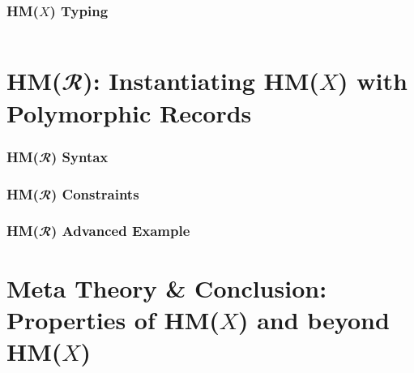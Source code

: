 \documentclass[aspectratio=169]{beamer}
\begin{document}
\begin{frame}[fragile]
  \frametitle{HM($X$) Typing}
  \begin{columns}
    \begin{column}{0.45\textwidth}
      \begin{center}
        \HMXLet
      \end{center}
      \begin{center}
        \HMXEq
      \end{center}
    \end{column}
    \begin{column}{0.45\textwidth}
      \begin{center}
        \HMXIntro
      \end{center}
      \begin{center}
        \HMXElim
      \end{center}
    \end{column}
  \end{columns}
\end{frame}

\section{HM($𝓡$): Instantiating HM($X$) with Polymorphic Records}

\begin{frame}[fragile]
  \frametitle{HM($𝓡$) Syntax}
\end{frame}

\begin{frame}[fragile]
  \frametitle{HM($𝓡$) Constraints}
\end{frame}

\begin{frame}[fragile]
  \frametitle{HM($𝓡$) Advanced Example}
\end{frame}

\section{Meta Theory \& Conclusion: Properties of HM($X$) and beyond HM($X$)}
\end{document}
